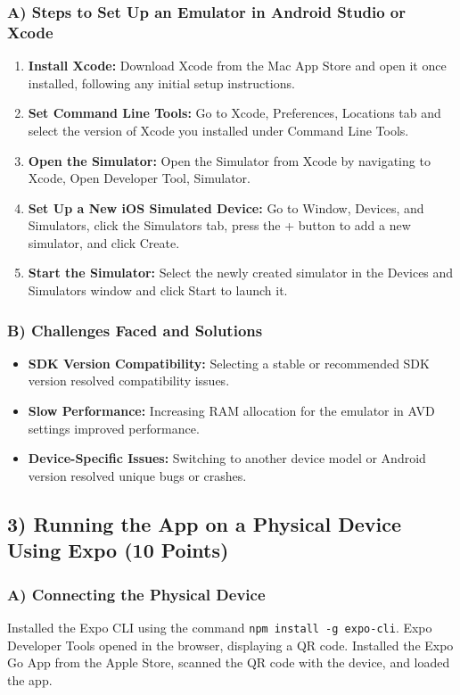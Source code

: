 \documentclass{article}
\begin{document}
\subsubsection*{A) Steps to Set Up an Emulator in Android Studio or Xcode}
\begin{enumerate}
    \item \textbf{Install Xcode:} Download Xcode from the Mac App Store and open it once installed, following any initial setup instructions.
    \item \textbf{Set Command Line Tools:} Go to Xcode, Preferences, Locations tab and select the version of Xcode you installed under Command Line Tools.
    \item \textbf{Open the Simulator:} Open the Simulator from Xcode by navigating to Xcode, Open Developer Tool, Simulator.
    \item \textbf{Set Up a New iOS Simulated Device:} Go to Window, Devices, and Simulators, click the Simulators tab, press the + button to add a new simulator, and click Create.
    \item \textbf{Start the Simulator:} Select the newly created simulator in the Devices and Simulators window and click Start to launch it.
\end{enumerate}

\subsubsection*{B) Challenges Faced and Solutions}
\begin{itemize}
    \item \textbf{SDK Version Compatibility:} Selecting a stable or recommended SDK version resolved compatibility issues.
    \item \textbf{Slow Performance:} Increasing RAM allocation for the emulator in AVD settings improved performance.
    \item \textbf{Device-Specific Issues:} Switching to another device model or Android version resolved unique bugs or crashes.
\end{itemize}

\subsection*{3) Running the App on a Physical Device Using Expo (10 Points)}

\subsubsection*{A) Connecting the Physical Device}
Installed the Expo CLI using the command \texttt{npm install -g expo-cli}. Expo Developer Tools opened in the browser, displaying a QR code. Installed the Expo Go App from the Apple Store, scanned the QR code with the device, and loaded the app.
\end{document}
